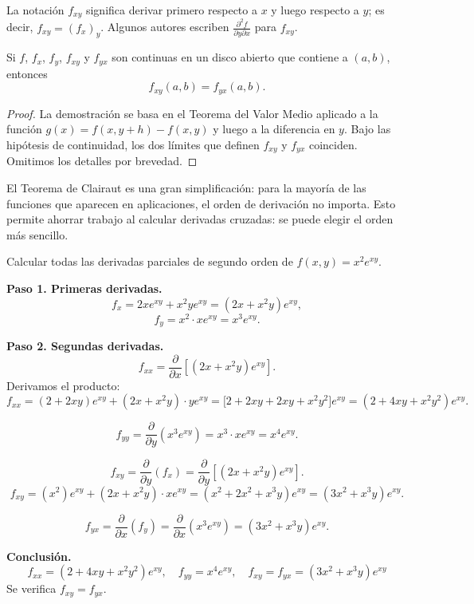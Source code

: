 \begin{rem}
La notación $f_{xy}$ significa derivar primero respecto a $x$ y
luego respecto a $y$; es decir, $f_{xy}=(f_x)_y$. Algunos autores
escriben $\frac{\partial^2 f}{\partial y\partial x}$ para $f_{xy}$.
\end{rem}

\begin{theorem}
Si $f$, $f_x$, $f_y$, $f_{xy}$ y $f_{yx}$ son continuas en un disco
abierto que contiene a $(a,b)$, entonces
\[
f_{xy}(a,b) = f_{yx}(a,b).
\]
\end{theorem}

\begin{proof}
La demostración se basa en el Teorema del Valor Medio aplicado a la
función $g(x)=f(x,y+h)-f(x,y)$ y luego a la diferencia en $y$. Bajo
las hipótesis de continuidad, los dos límites que definen $f_{xy}$ y
$f_{yx}$ coinciden. Omitimos los detalles por brevedad.
\end{proof}

\begin{rem}
El Teorema de Clairaut es una gran simplificación: para la mayoría
de las funciones que aparecen en aplicaciones, el orden de derivación
no importa. Esto permite ahorrar trabajo al calcular derivadas
cruzadas: se puede elegir el orden más sencillo.
\end{rem}

\begin{example}
Calcular todas las derivadas parciales de segundo orden de
$f(x,y)=x^2 e^{xy}$.
\end{example}

\begin{myproof}
\textbf{Paso 1. Primeras derivadas.}
\[
f_x = 2x e^{xy} + x^2 y e^{xy} = (2x + x^2 y)e^{xy},
\]
\[
f_y = x^2 \cdot x e^{xy} = x^3 e^{xy}.
\]

\textbf{Paso 2. Segundas derivadas.}
\[
f_{xx} = \frac{\partial}{\partial x}\left[(2x+x^2y)e^{xy}\right].
\]
Derivamos el producto:
\[
f_{xx} = (2+2xy)e^{xy} + (2x+x^2y)\cdot y e^{xy}
= \bigl[2+2xy + 2xy + x^2 y^2\bigr]e^{xy}
= (2+4xy+x^2 y^2)e^{xy}.
\]

\[
f_{yy} = \frac{\partial}{\partial y}(x^3 e^{xy})
= x^3 \cdot x e^{xy} = x^4 e^{xy}.
\]

\[
f_{xy} = \frac{\partial}{\partial y}(f_x)
= \frac{\partial}{\partial y}\left[(2x+x^2y)e^{xy}\right].
\]
\[
f_{xy} = (x^2)e^{xy} + (2x+x^2y)\cdot x e^{xy}
= (x^2 + 2x^2 + x^3 y)e^{xy}
= (3x^2 + x^3 y)e^{xy}.
\]

\[
f_{yx} = \frac{\partial}{\partial x}(f_y)
= \frac{\partial}{\partial x}(x^3 e^{xy})
= (3x^2 + x^3 y)e^{xy}.
\]

\textbf{Conclusión.}
\[
\boxed{
f_{xx}=(2+4xy+x^2y^2)e^{xy},\quad
f_{yy}=x^4 e^{xy},\quad
f_{xy}=f_{yx}=(3x^2+x^3y)e^{xy}
}
\]
Se verifica $f_{xy}=f_{yx}$.
\end{myproof}

